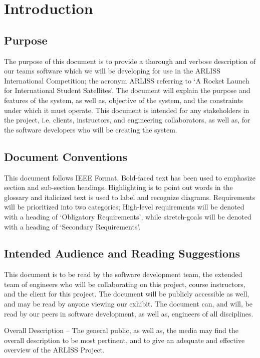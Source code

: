 \documentclass{scrreprt}
\begin{document}
\chapter{Introduction}

\section{Purpose}
The purpose of this document is to provide a thorough and verbose description of our teams software which we will be developing for use in the ARLISS International Competition; the acronym ARLISS referring to ‘A Rocket Launch for International Student Satellites’. The document will explain the purpose and features of the system, as well as, objective of the system, and the constraints under which it must operate. This document is intended for any stakeholders in the project, i.e. clients, instructors, and engineering collaborators, as well as, for the software developers who will be creating the system.

\section{Document Conventions}
This document follows IEEE Format. Bold-faced text has been used to emphasize section and sub-section headings. Highlighting is to point out words in the glossary and italicized text is used to label and recognize diagrams. Requirements will be prioritized into two categories; High-level requirements will be denoted with a heading of ‘Obligatory Requirements’, while stretch-goals will be denoted with a heading of ‘Secondary Requirements’.

\section{Intended Audience and Reading Suggestions}
This document is to be read by the software development team, the extended team of engineers who will be collaborating on this project, course instructors, and the client for this project. The document will be publicly accessible as well, and may be read by anyone viewing our exhibit. The document can, and will, be read by our peers in software development, as well as, engineers of all disciplines. 

Overall Description – The general public, as well as, the media may find the overall description to be most pertinent, and to give an adequate and effective overview of the ARLISS Project.
\end{document}
